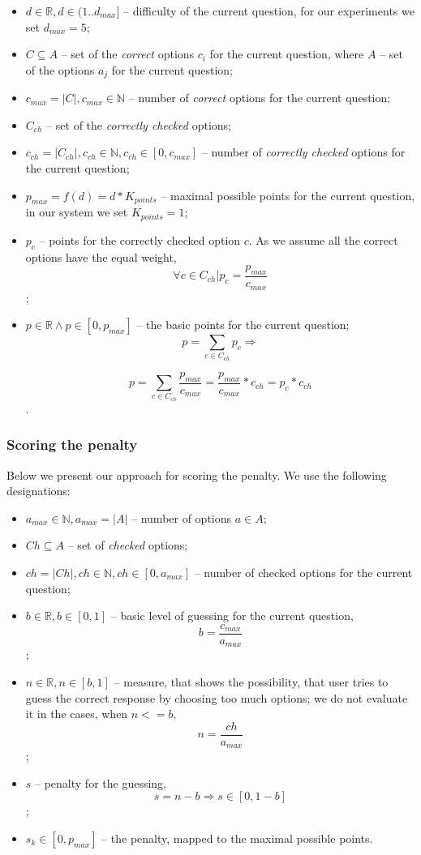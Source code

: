 \documentclass[PhD, Submit, ngerman,UKenglish,table]{scrbook}
\begin{document}
\begin{itemize}
    \item $d \in \mathbb{R} , d \in (1..d_{max}]$ -- difficulty of the current question, for our experiments we set $d_{max} = 5$; 
    \item $C \subseteq A$ -- set of the \textit{correct} options $c_i$ for the current question, where $A$ -- set of the options $a_j$ for the current question;
    \item $c_{max} = |C| , c_{max} \in \mathbb{N}$ -- number of \textit{correct} options for the current question;
    \item $C_{ch}$ -- set of the \textit{correctly checked} options;
    \item $c_{ch} = |C_{ch}| , c_{ch} \in \mathbb{N} , c_{ch} \in [0,c_{max}]$ -- number of \textit{correctly checked} options for the current question;
    \item $p_{max} = f(d) = d*K_{points}$ -- maximal possible points for the current question, in our system we set $K_{points} = 1$;
    \item $p_c$ -- points for the correctly checked option $c$. 
    As we assume all the correct options have the equal weight, 
    \[\forall c \in C_{ch} \vert p_c = \frac{p_{max}}{c_{max}}\];
    \item $p \in \mathbb{R} \wedge p \in [0,p_{max}]$ -- the basic points for the current question;
    \[p = \sum_{c \in C_{ch}}{p_c} \Rightarrow \]

   \[p = \sum_{c \in C_{ch}}{\frac{p_{max}}{c_{max}}} = \frac{p_{max}}  {c_{max}}*c_{ch} = p_c*c_{ch}\].
\end{itemize}

\subsubsection{Scoring the penalty}

Below we present our approach for scoring the penalty.
We use the following designations:

\begin{itemize}
    \item $a_{max} \in \mathbb{N} , a_{max} = |A|$ -- number of options $a \in A$;
    \item $Ch \subseteq A$ -- set of \textit{checked} options;
    \item $ch = |Ch| , ch \in \mathbb{N} , ch \in [0,a_{max}]$ -- number of checked options for the current question;
    \item $b \in \mathbb{R} , b \in [0,1]$ -- basic level of guessing for the current question, 
    \[b = \frac{c_{max}}{a_{max}}\];
    \item $n \in \mathbb{R} , n \in [b,1]$ -- measure, that shows the possibility, that user tries to guess the correct response by choosing too much options; we do not evaluate it in the cases, when $n <= b$,
   \[n = \frac{ch}{a_{max}}\];
    \item $s$ -- penalty for the guessing,
    \[s = n-b \Rightarrow s \in [0,1-b]\];
    \item $s_k \in [0,p_{max}]$ -- the penalty, mapped to the maximal possible points.
\end{itemize}
\end{document}
